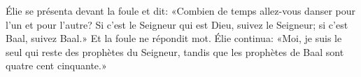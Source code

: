 Élie se présenta devant la foule et dit:
	«Combien de temps allez-vous danser pour l’un et pour l’autre?
	Si c’est le Seigneur qui est Dieu, suivez le Seigneur;
	si c’est Baal, suivez Baal.»
Et la foule ne répondit mot.
Élie continua: «Moi, je suis le seul qui reste des prophètes du Seigneur,
	tandis que les prophètes de Baal sont quatre cent cinquante.»
